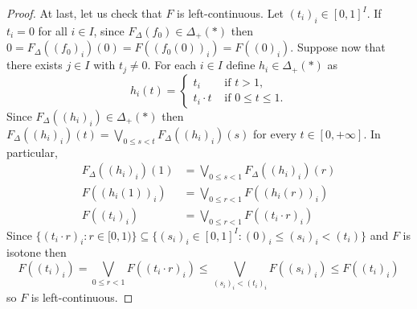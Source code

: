 \documentclass[10pt,a4paper]{amsart}
\begin{document}
\begin{proof}
		At last, let us check that $F$ is left-continuous. Let $(t_i)_i\in [0,1]^I.$ If $t_i=0$ for all $i\in I$, since $F_\Delta(f_0)\in\Delta_+(\ast)$ then $0=F_\Delta((f_0)_i)(0)=F((f_0(0))_i)=F((0)_i).$ Suppose now that there exists $j\in I$ with $t_j\neq 0.$ For each $i\in I$ define $h_i\in \Delta_+(\ast)$ as
		$$h_i(t)=\begin{cases}
			t_i&\text{ if }t>1,\\
			t_i\cdot t&\text{ if }0\leq t\leq 1.
		\end{cases}$$
		Since $F_\Delta((h_i)_i)\in\Delta_+(\ast)$ then $F_\Delta((h_i)_i)(t)=\bigvee_{0\leq s<t}F_\Delta((h_i)_i)(s)$ for every $t\in [0,+\infty].$ In particular,
		\begin{align*}
			F_\Delta((h_i)_i)(1)&=\bigvee_{0\leq s<1}F_\Delta((h_i)_i)(r)\\
			F((h_i(1))_i)&=\bigvee_{0\leq r<1}F((h_i(r))_i)\\
			F((t_i)_i)&=\bigvee_{0\leq r<1}F((t_i\cdot r)_i)
		\end{align*}
		Since $\{(t_i\cdot r)_i:r\in [0,1)\}\subseteq \{(s_i)_i\in [0,1]^I: (0)_i\leq (s_i)_i<(t_i)\}$ and $F$ is isotone then 
		$$F((t_i)_i)=\bigvee_{0\leq r<1}F((t_i\cdot r)_i)\leq\bigvee_{(s_i)_i<(t_i)_i}F((s_i)_i)\leq F((t_i)_i) $$ so $F$ is left-continuous.
	\end{proof}
\end{document}
